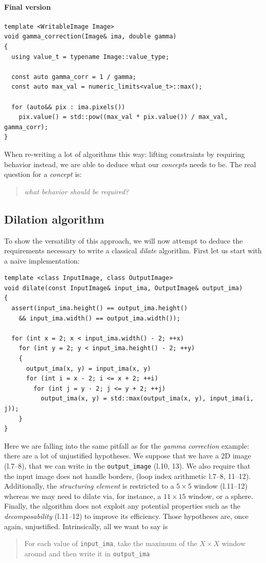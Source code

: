\paragraph{Final version}

\begin{verbatim}
template <WritableImage Image>
void gamma_correction(Image& ima, double gamma)
{
  using value_t = typename Image::value_type;

  const auto gamma_corr = 1 / gamma;
  const auto max_val = numeric_limits<value_t>::max();

  for (auto&& pix : ima.pixels())
    pix.value() = std::pow((max_val * pix.value()) / max_val, gamma_corr);
}
\end{verbatim}

\noindent When re-writing a lot of algorithms this way: lifting constraints by requiring behavior instead, we are able
to deduce what our \emph{concepts} needs to be. The real question for a \emph{concept} is: \blockquote{\emph{what
    behavior should be required?}}



\subsection{Dilation algorithm}
\label{subsec:dilation}

To show the versatility of this approach, we will now attempt to deduce the requirements necessary to write a classical
\emph{dilate} algorithm. First let us start with a naive implementation:

\begin{verbatim}
template <class InputImage, class OutputImage>
void dilate(const InputImage& input_ima, OutputImage& output_ima)
{
  assert(input_ima.height() == output_ima.height()
    && input_ima.width() == output_ima.width());

  for (int x = 2; x < input_ima.width() - 2; ++x)
    for (int y = 2; y < input_ima.height() - 2; ++y)
    {
      output_ima(x, y) = input_ima(x, y)
      for (int i = x - 2; i <= x + 2; ++i)
        for (int j = y - 2; j <= y + 2; ++j)
          output_ima(x, y) = std::max(output_ima(x, y), input_ima(i, j));
    }
}
\end{verbatim}

\noindent Here we are falling into the same pitfall as for the \emph{gamma correction} example: there are a lot of
unjustified hypotheses. We suppose that we have a 2D image (l.7--8), that we can write in the \texttt{output\_image}
(l.10, 13). We also require that the input image does not handle borders, (\cf loop index arithmetic l.7--8, 11--12).
Additionally, the \emph{structuring element} is restricted to a \(5 \times 5\) window (l.11--12) whereas we may need to
dilate via, for instance, a \(11 \times 15\) window, or a sphere. Finally, the algorithm does not exploit any potential
properties such as the \emph{decomposability} (l.11--12) to improve its efficiency. Those hypotheses are, once again,
unjustified. Intrinsically, all we want to say is \blockquote{For each value of \texttt{input\_ima}, take the maximum of
  the \(X \times X\) window around and then write it in \texttt{output\_ima}}.

